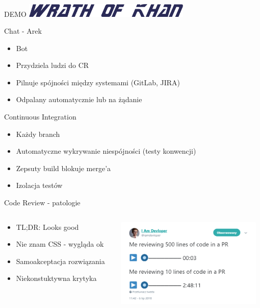 \documentclass[ignorenonframetext]{beamer}
\begin{document}
\begin{frame}{DEMO}
	\centering
	\includegraphics[width=8cm]{images/wrath-of-khan.png}
\end{frame}

\begin{frame}{Chat - Arek}
\begin{itemize}
	\item Bot 
	\item Przydziela ludzi do CR
	\item Pilnuje spójności między systemami (GitLab, JIRA)
	\item Odpalany automatycznie lub na żądanie
\end{itemize}
\end{frame}

\begin{frame}{Continuous Integration}
\begin{itemize}
	\item Każdy branch
	\item Automatyczne wykrywanie niespójności (testy konwencji)
	\item Zepsuty build blokuje merge'a
	\item Izolacja testów
\end{itemize}
\end{frame}

\begin{frame}{Code Review - patologie}
\begin{columns}
	\begin{column}{0.45\textwidth}
		\begin{itemize}
			\item TL;DR: Looks good
			\item Nie znam CSS - wygląda ok
			\item Samoakceptacja rozwiązania
			\item Niekonstuktywna krytyka
		\end{itemize}
	\end{column}
	\begin{column}{0.55\textwidth}
		\includegraphics[width=7cm]{images/cr500lines.png}
	\end{column}
\end{columns}
\end{frame}
\end{document}
